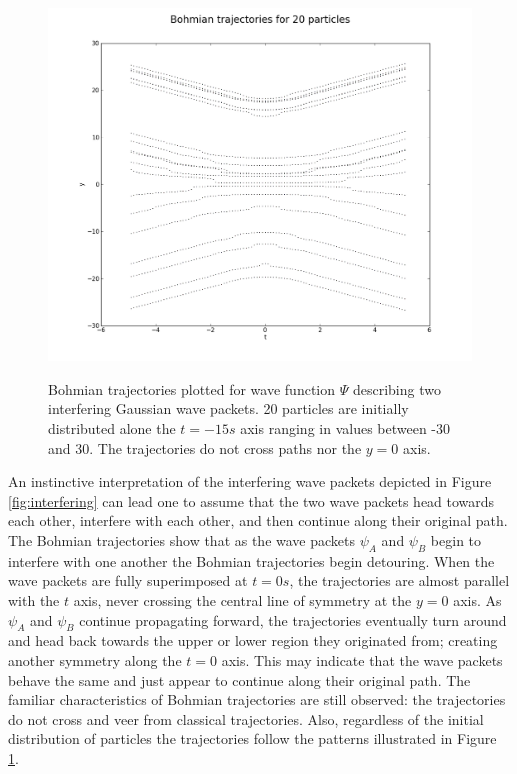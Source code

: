 \documentclass[10pt, reqno]{article}
\begin{document}
  \begin{figure}[ht]
    {\centering \includegraphics[scale=.4]{./imgs/interfering-trajectories.png} \\}
    \caption{
      Bohmian trajectories plotted for wave function $\Psi$ describing two interfering Gaussian wave packets.
      20 particles are initially distributed alone the $t=-15s$ axis ranging in values between -30 and 30.
      The trajectories do not cross paths nor the $y=0$ axis.
    }
    \label{fig:interfering-trajectories}
  \end{figure}

  An instinctive interpretation of the interfering wave packets depicted in Figure \ref{fig:interfering} can lead one to assume that the two wave packets 
    head towards each other, interfere with each other, and then continue along their original path.
  The Bohmian trajectories show that as the wave packets $\psi_A$ and $\psi_B$ begin to interfere with one another the Bohmian trajectories begin detouring.
  When the wave packets are fully superimposed at $t=0s$, the trajectories are almost parallel with the $t$ axis, never crossing the central line of symmetry at the $y=0$ axis. 
  As $\psi_A$ and $\psi_B$ continue propagating forward, the trajectories eventually turn around and head back towards the upper or lower region they originated from;
    creating another symmetry along the $t=0$ axis.
  This may indicate that the wave packets behave the same and just appear to continue along their original path.
  The familiar characteristics of Bohmian trajectories are still observed: the trajectories do not cross and veer from classical trajectories.
  Also, regardless of the initial distribution of particles the trajectories follow the patterns illustrated in Figure \ref{fig:interfering-trajectories}.
\end{document}
